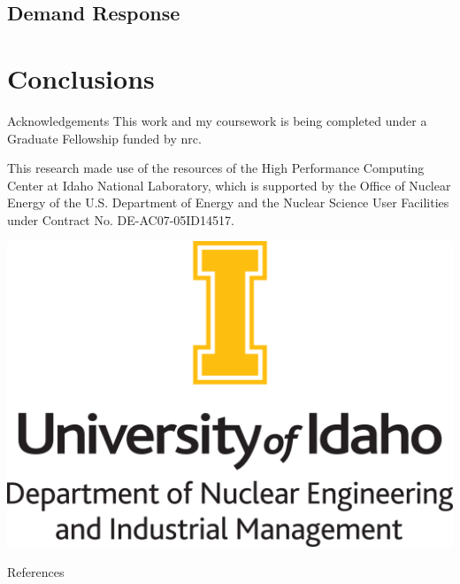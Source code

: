 \documentclass[aspectratio=169,pdftex,dvipsnames]{beamer}
\newcommand{\acf}{\acrfull} %
\begin{document}
\subsection{Demand Response}

\section{Conclusions}


\begin{frame}{Acknowledgements}
    \centering
    This work and my coursework is being completed under a Graduate Fellowship funded by \acf{nrc}.

    This research made use of the resources of the High Performance Computing Center at Idaho National Laboratory, which is supported by the Office of Nuclear Energy of the U.S. Department of Energy and the Nuclear Science User Facilities under Contract No. DE-AC07-05ID14517.
\end{frame}

\begin{frame}[plain]{}
    \addtolength\textwidth{2cm} 
    \setlength\hsize{\textwidth} 
    \setlength\columnwidth{\textwidth}
    \vfill\centering
    \includegraphics[height=0.9\textheight]{logo}
    \vfill
\end{frame}


\begin{frame}[allowframebreaks]{References}
    
    \footnotesize
    
\end{frame}
\end{document}
